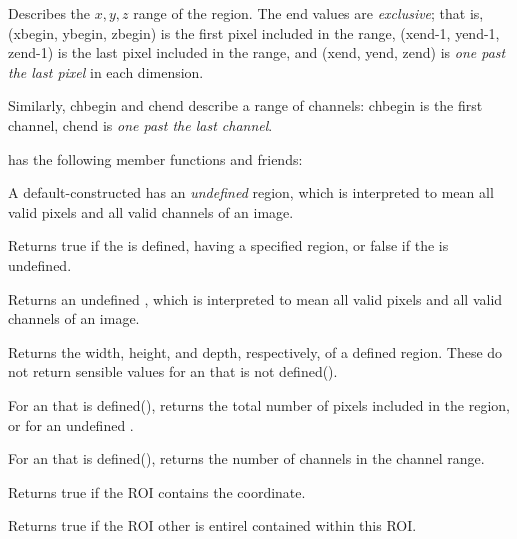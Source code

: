 Describes the $x, y, z$ range of the region.  The {\cf end} values are
\emph{exclusive}; that is, ({\cf xbegin, ybegin, zbegin}) is the first
pixel included in the range, ({\cf xend-1, yend-1, zend-1}) is the last
pixel included in the range, and ({\cf xend, yend, zend}) is \emph{one
past the last pixel} in each dimension.

Similarly, {\cf chbegin} and {\cf chend} describe a range of channels:
{\cf chbegin} is the first channel, {\cf chend} is \emph{one past the last
channel}.
\apiend

\smallskip

\noindent \ROI has the following member functions and friends:

\smallskip

A default-constructed \ROI has an \emph{undefined} region, which
is interpreted to mean all valid pixels and all valid channels of
an image.
\apiend

Returns {\cf true} if the \ROI is defined, having a specified region,
or {\cf false} if the \ROI is undefined.
\apiend

Returns an undefined \ROI, which is interpreted to mean all valid pixels
and all valid channels of an image.
\apiend

Returns the width, height, and depth, respectively, of a defined region.
These do not return sensible values for an \ROI that is not {\cf defined()}.
\apiend

For an \ROI that is {\cf defined()}, returns the total number of pixels
included in the region, or {} for an undefined \ROI.
\apiend

For an \ROI that is {\cf defined()}, returns the number of channels
in the channel range.
\apiend

\NEW %
Returns {\cf true} if the ROI contains the coordinate.
\apiend

\NEW %
Returns {\cf true} if the ROI {\cf other} is entirel contained within
this ROI.
\apiend

